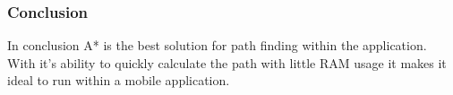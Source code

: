 \subsubsection{Conclusion}
In conclusion A* is the best solution for path finding within the application. With it’s ability to quickly calculate the path with little RAM usage it makes it ideal to run within a mobile application. 